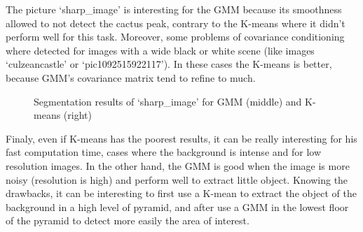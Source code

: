 \documentclass[runningheads,a4paper]{llncs}
\begin{document}
The picture `sharp\_image' is interesting for the GMM because its smoothness allowed to not detect the cactus peak, contrary to the K-means where it didn't perform well for this task. Moreover, some problems of covariance conditioning where detected for images with a wide black or white scene (like images `culzeancastle' or `pic1092515922117'). In these cases the K-means is better, because GMM's covariance matrix tend to refine to much. 
\begin{figure}
\centering
{}\qquad
{}\qquad
{}
\caption{Segmentation results of `sharp\_image' for GMM (middle) and K-means (right)}
\end{figure}
\par Finaly, even if K-means has the poorest results, it can be really interesting for his fast computation time, cases where the background is intense and for low resolution images. In the other hand, the GMM is good when the image is more noisy (resolution is high) and perform well to extract little object. Knowing the drawbacks, it can be interesting to first use a K-mean to extract the object of the background in a high level of pyramid, and after use a GMM in the lowest floor of the pyramid to detect more easily the area of interest.

{\small


}
\end{document}
